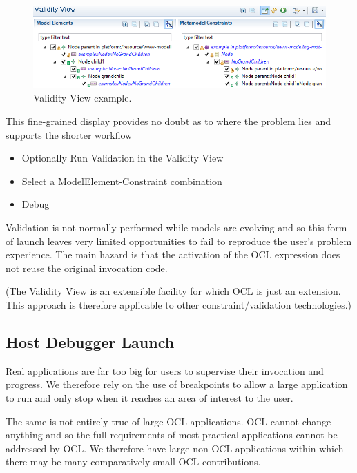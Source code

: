 \documentclass[a4paper]{article}
\begin{document}
\begin{figure}
  \begin{center}
    \includegraphics[width=6.75in]{ValidityView.png}
  \end{center}
  \caption{Validity View example.}
  \label{fig:ValidityView}
\end{figure}

This fine-grained display provides no doubt as to where the problem lies and supports the shorter workflow

\begin{itemize}
\item Optionally Run Validation in the Validity View
\item Select a ModelElement-Constraint combination
\item Debug
\end{itemize}

Validation is not normally performed while models are evolving and so this form of launch leaves very limited opportunities to fail to reproduce the user's problem experience. The main hazard is that the activation of the OCL expression does not reuse the original invocation code.

(The Validity View is an extensible facility for which OCL is just an extension. This approach is therefore applicable to other constraint/validation technologies.)

\subsection{Host Debugger Launch}\label{HostLaunch}

Real applications are far too big for users to supervise their invocation and progress. We therefore rely on the use of breakpoints to allow a large application to run and only stop when it reaches an area of interest to the user.

The same is not entirely true of large OCL applications. OCL cannot change anything and so the full requirements of most practical applications cannot be addressed by OCL. We therefore have large non-OCL applications within which there may be many comparatively small OCL contributions. 
\end{document}
